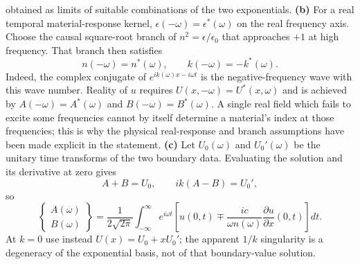 obtained as limits of suitable combinations of the two exponentials.
\textbf{(b)} For a real temporal material-response kernel,
$\epsilon(-\omega)=\epsilon^*(\omega)$ on the real frequency axis.
Choose the causal square-root branch of $n^2=\epsilon/\epsilon_0$
that approaches $+1$ at high frequency. That branch then satisfies
\[
\boxed{n(-\omega)=n^*(\omega),\qquad
k(-\omega)=-k^*(\omega).}
\]
Indeed, the complex conjugate of $e^{ik(\omega)x-i\omega t}$ is the
negative-frequency wave with this wave number. Reality of $u$ requires
$U(x,-\omega)=U^*(x,\omega)$ and is achieved by
$A(-\omega)=A^*(\omega)$ and $B(-\omega)=B^*(\omega)$.
A single real field which fails to excite some frequencies cannot
by itself determine a material's index at those frequencies; this
is why the physical real-response and branch assumptions have been
made explicit in the statement.
\textbf{(c)} Let $U_0(\omega)$ and $U_0'(\omega)$ be the unitary
time transforms of the two boundary data. Evaluating the solution
and its derivative at zero gives
\[
A+B=U_0,\qquad ik(A-B)=U_0',
\]
so
\[
\boxed{\begin{Bmatrix}A(\omega)\\B(\omega)\end{Bmatrix}
=\frac1{2\sqrt{2\pi}}\int_{-\infty}^\infty
 e^{i\omega t}\left[u(0,t)\mp\frac{ic}{\omega n(\omega)}
 \frac{\partial u}{\partial x}(0,t)\right]dt.}
\]
At $k=0$ use instead $U(x)=U_0+xU_0'$; the apparent $1/k$
singularity is a degeneracy of the exponential basis, not of that
boundary-value solution.

